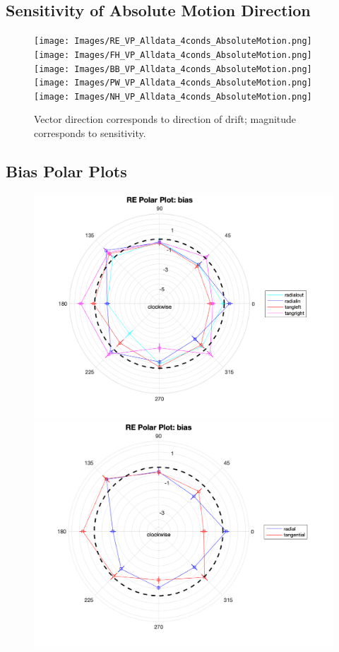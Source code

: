 \documentclass[11pt]{article} %
\begin{document}
\newpage
\subsection{Sensitivity of Absolute Motion Direction}
\begin{figure}[H]
\centering %
\texttt{[image: Images/RE\_VP\_Alldata\_4conds\_AbsoluteMotion.png]}
\texttt{[image: Images/FH\_VP\_Alldata\_4conds\_AbsoluteMotion.png]}
\texttt{[image: Images/BB\_VP\_Alldata\_4conds\_AbsoluteMotion.png]}
\texttt{[image: Images/PW\_VP\_Alldata\_4conds\_AbsoluteMotion.png]}
\texttt{[image: Images/NH\_VP\_Alldata\_4conds\_AbsoluteMotion.png]}
\caption{Vector direction corresponds to direction of drift; magnitude corresponds to sensitivity.}
\end{figure}

\newpage
\subsection{Bias Polar Plots}
\begin{figure}[H]
\centering %
\includegraphics[scale=.3]{Images/RE_PP_bias_Alldata_4conds.png}
\includegraphics[scale=.3]{Images/RE_PP_bias_Alldata_2conds.png}
\end{figure}
\end{document}
